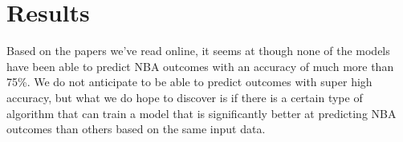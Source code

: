 \documentclass[letterpaper]{article} %
\begin{document}

\section{Results}

Based on the papers we’ve read online, it seems at though none of the models have been able to predict NBA outcomes with an accuracy of much more than 75\%. We do not anticipate to be able to predict outcomes with super high accuracy, but what we do hope to discover is if there is a certain type of algorithm that can train a model that is significantly better at predicting NBA outcomes than others based on the same input data.

\newpage


\end{document}
